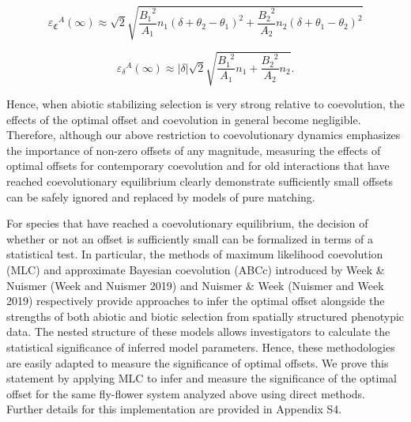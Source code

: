 \documentclass[]{article}
\begin{document}
\begin{equation}
{\varepsilon_\mathfrak{C}}^A(\infty)\approx\sqrt 2\sqrt{
\frac{{B_1}^2}{A_1}n_1(\delta+\theta_2-\theta_1)^2+
\frac{{B_2}^2}{A_2}n_2(\delta+\theta_1-\theta_2)^2}
\end{equation}

\begin{equation}
{\varepsilon_\delta}^A(\infty)\approx|\delta|\sqrt 2\sqrt{
\frac{{B_1}^2}{A_1}n_1+\frac{{B_2}^2}{A_2}n_2}.
\end{equation}

Hence, when abiotic stabilizing selection is very strong relative to
coevolution, the effects of the optimal offset and coevolution in
general become negligible. Therefore, although our above restriction to
coevolutionary dynamics emphasizes the importance of non-zero offsets of
any magnitude, measuring the effects of optimal offsets for contemporary
coevolution and for old interactions that have reached coevolutionary
equilibrium clearly demonstrate sufficiently small offsets can be safely
ignored and replaced by models of pure matching.

For species that have reached a coevolutionary equilibrium, the decision
of whether or not an offset is sufficiently small can be formalized in
terms of a statistical test. In particular, the methods of maximum
likelihood coevolution (MLC) and approximate Bayesian coevolution (ABCc)
introduced by Week \& Nuismer (Week and Nuismer 2019) and Nuismer \&
Week (Nuismer and Week 2019) respectively provide approaches to infer
the optimal offset alongside the strengths of both abiotic and biotic
selection from spatially structured phenotypic data. The nested
structure of these models allows investigators to calculate the
statistical significance of inferred model parameters. Hence, these
methodologies are easily adapted to measure the significance of optimal
offsets. We prove this statement by applying MLC to infer and measure
the significance of the optimal offset for the same fly-flower system
analyzed above using direct methods. Further details for this
implementation are provided in Appendix S4.
\end{document}
